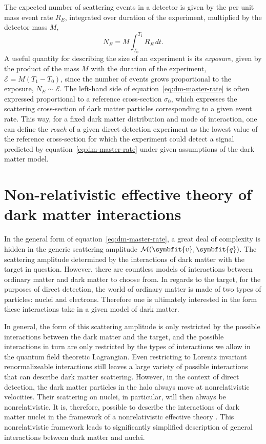 \documentclass[b5paper, 10pt, twoside]{book}
\renewcommand{\vec}[1]{\symbfit{#1}}
\newcommand{\difd}{\,d}
\begin{document}
The expected number of scattering events in a detector is given by the per unit mass event rate $R_E$, integrated over duration of the experiment, multiplied by the detector mass $M$,
\begin{equation}
    N_E=M\int_{T_0}^{T_1} R_E\difd t.
\end{equation}
A useful quantity for describing the size of an experiment is its \emph{exposure}, given by the product of the mass $M$ with the duration of the experiment, $\mathcal{E}=M(T_1-T_0)$, since the number of events grows proportional to the exposure, $N_E\sim\mathcal{E}$. The left-hand side of equation~\eqref{eq:dm-master-rate} is often expressed proportional to a reference cross-section $\sigma_0$, which expresses the scattering cross-section of dark matter particles corresponding to a given event rate. This way, for a fixed dark matter distribution and mode of interaction, one can define the \emph{reach} of a given direct detection experiment as the lowest value of the reference cross-section for which the experiment could detect a signal predicted by equation~\eqref{eq:dm-master-rate} under given assumptions of the dark matter model.

\section{Non-relativistic effective theory of dark matter interactions}
\label{chap:eft}

In the general form of equation~\eqref{eq:dm-master-rate}, a great deal of complexity is hidden in the generic scattering amplitude $\mathcal{M}(\vec{v},\vec{q})$. The scattering amplitude determined by the interactions of dark matter with the target in question. However, there are countless models of interactions between ordinary matter and dark matter to choose from. In regards to the target, for the purposes of direct detection, the world of ordinary matter is made of two types of particles: nuclei and electrons. Therefore one is ultimately interested in the form these interactions take in a given model of dark matter.

In general, the form of this scattering amplitude is only restricted by the possible interactions between the dark matter and the target, and the possible interactions in turn are only restricted by the types of interactions we allow in the quantum field theoretic Lagrangian. Even restricting to Lorentz invariant renormalizeable interactions still leaves a large variety of possible interactions that can describe dark matter scattering. However, in the context of direct detection, the dark matter particles in the halo always move at nonrelativistic velocities. Their scattering on nuclei, in particular, will then always be nonrelativistic. It is, therefore, possible to describe the interactions of dark matter nuclei in the framework of a nonrelativistic effective theory \parencite{FitzpatrickEtAl2013}. This nonrelativistic framework leads to significantly simplified description of general interactions between dark matter and nuclei.
\end{document}
